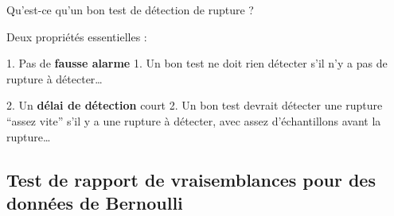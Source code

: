 \documentclass[11pt,french,ignorenonframetext,]{beamer}
\begin{document}
\begin{frame}{Qu'est-ce qu'un bon test de détection de rupture ?}

  Deux propriétés essentielles :

  \begin{block}{1. Pas de \textbf{fausse alarme}}
    1. Un bon test ne doit rien détecter s'il n'y a pas de rupture à détecter\ldots

  \end{block}

  \begin{block}{2. Un \textbf{délai de détection} court}
    2. Un bon test devrait détecter une rupture ``assez vite'' s'il y a une rupture à détecter, avec assez d'échantillons avant la rupture\ldots

  \end{block}


\end{frame}


\subsection{\hfill{}Test de rapport de vraisemblances pour des données de Bernoulli\hfill{}}
\end{document}
